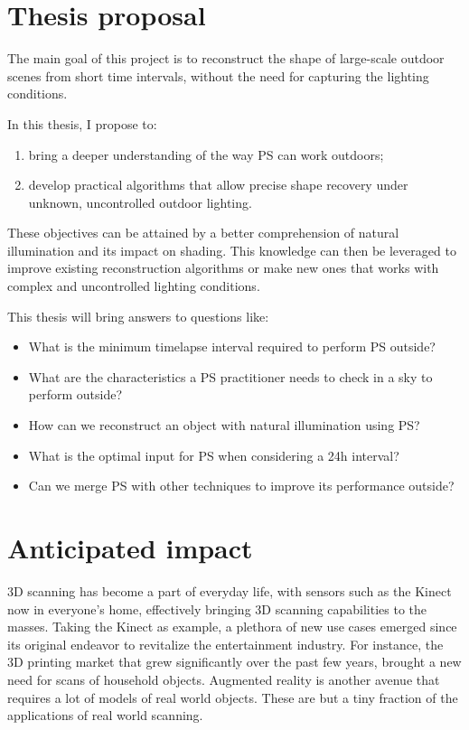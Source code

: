 \documentclass{report}
\begin{document}
\section{Thesis proposal}

The main goal of this project is to reconstruct the shape of large-scale outdoor scenes from short time intervals, without the need for capturing the lighting conditions.

In this thesis, I propose to:
\begin{enumerate}
  \item bring a deeper understanding of the way PS can work outdoors;
  \item develop practical algorithms that allow precise shape recovery under unknown, uncontrolled outdoor lighting.
\end{enumerate}
These objectives can be attained by a better comprehension of natural illumination and its impact on shading. This knowledge can then be leveraged to improve existing reconstruction algorithms or make new ones that works with complex and uncontrolled lighting conditions.

This thesis will bring answers to questions like:
\begin{itemize}
  \item What is the minimum timelapse interval required to perform PS outside?
  \item What are the characteristics a PS practitioner needs to check in a sky to perform outside?
  \item How can we reconstruct an object with natural illumination using PS?
  \item What is the optimal input for PS when considering a 24h interval?
  \item Can we merge PS with other techniques to improve its performance outside?
\end{itemize}

\section{Anticipated impact}

3D scanning has become a part of everyday life, with sensors such as the Kinect now in everyone's home, effectively bringing 3D scanning capabilities to the masses. Taking the Kinect as example, a plethora of new use cases emerged since its original endeavor to revitalize the entertainment industry. For instance, the 3D printing market that grew significantly over the past few years, brought a new need for scans of household objects. Augmented reality is another avenue that requires a lot of models of real world objects. These are but a tiny fraction of the applications of real world scanning.
\end{document}
